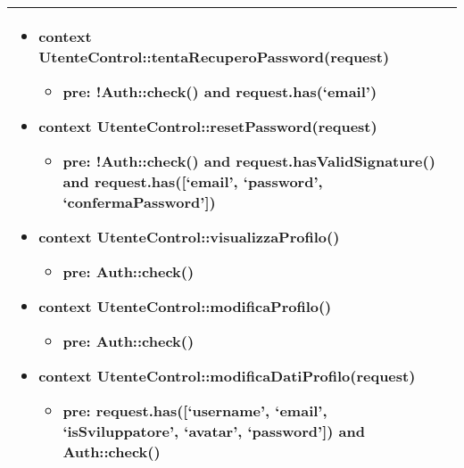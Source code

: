 \begin{tabular}{|| l | p{28em} ||}
\begin{itemize}
	    \item \textbf{context} UtenteControl::tentaRecuperoPassword(request) 
		\begin{itemize}
			\item[ ] \textbf{pre:} !Auth::check() and request.has(‘email’)
		\end{itemize} 
	  
	    \item \textbf{context} UtenteControl::resetPassword(request) 
		\begin{itemize}
			\item[ ] \textbf{pre:} !Auth::check() and request.hasValidSignature() and request.has([‘email’, ‘password’, ‘confermaPassword’])
		\end{itemize} 
	  
	    \item \textbf{context} UtenteControl::visualizzaProfilo() 
		\begin{itemize}
			\item[ ] \textbf{pre:} Auth::check()
		\end{itemize} 
	  
	    \item \textbf{context} UtenteControl::modificaProfilo() 
		\begin{itemize}
			\item[ ] \textbf{pre:} Auth::check()
		\end{itemize} 
	  
	    \item \textbf{context} UtenteControl::modificaDatiProfilo(request) 
		\begin{itemize}
			\item[ ] \textbf{pre:} request.has([‘username’, ‘email’, ‘isSviluppatore’, ‘avatar’, ‘password’]) and Auth::check()
		\end{itemize} 
	\end{itemize}\\
	\hline
\end{tabular}

\newpage
